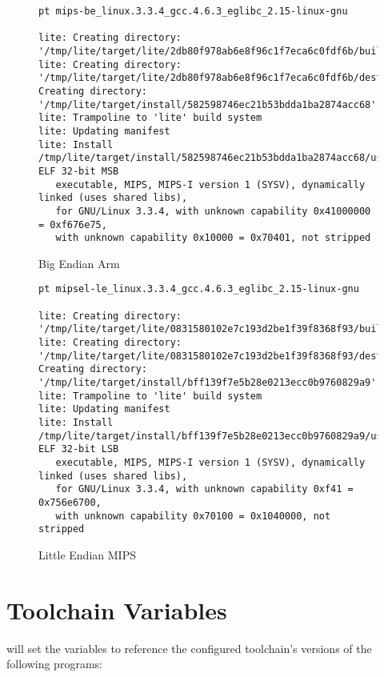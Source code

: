 \begin{landscape}
\begin{figure}
\hrulefill
\begin{verbatim}
pt mips-be_linux.3.3.4_gcc.4.6.3_eglibc_2.15-linux-gnu

lite: Creating directory: '/tmp/lite/target/lite/2db80f978ab6e8f96c1f7eca6c0fdf6b/build'
lite: Creating directory: '/tmp/lite/target/lite/2db80f978ab6e8f96c1f7eca6c0fdf6b/destdir'
Creating directory: '/tmp/lite/target/install/582598746ec21b53bdda1ba2874acc68'
lite: Trampoline to 'lite' build system
lite: Updating manifest
lite: Install
/tmp/lite/target/install/582598746ec21b53bdda1ba2874acc68/usr/bin/lite: ELF 32-bit MSB
   executable, MIPS, MIPS-I version 1 (SYSV), dynamically linked (uses shared libs),
   for GNU/Linux 3.3.4, with unknown capability 0x41000000 = 0xf676e75,
   with unknown capability 0x10000 = 0x70401, not stripped
\end{verbatim}
\caption{Big Endian Arm}\label{toolchain-usage:be-mips}
\hrulefill
\end{figure}

\begin{figure}
\hrulefill
\begin{verbatim}
pt mipsel-le_linux.3.3.4_gcc.4.6.3_eglibc_2.15-linux-gnu

lite: Creating directory: '/tmp/lite/target/lite/0831580102e7c193d2be1f39f8368f93/build'
lite: Creating directory: '/tmp/lite/target/lite/0831580102e7c193d2be1f39f8368f93/destdir'
Creating directory: '/tmp/lite/target/install/bff139f7e5b28e0213ecc0b9760829a9'
lite: Trampoline to 'lite' build system
lite: Updating manifest
lite: Install
/tmp/lite/target/install/bff139f7e5b28e0213ecc0b9760829a9/usr/bin/lite: ELF 32-bit LSB
   executable, MIPS, MIPS-I version 1 (SYSV), dynamically linked (uses shared libs),
   for GNU/Linux 3.3.4, with unknown capability 0xf41 = 0x756e6700,
   with unknown capability 0x70100 = 0x1040000, not stripped
\end{verbatim}
\caption{Little Endian MIPS}\label{toolchain-usage:le-mips}
\hrulefill
\end{figure}
\end{landscape}



\section{Toolchain Variables}

\lmsbw will set the \makefile variables to reference the configured
toolchain's versions of the following programs:


